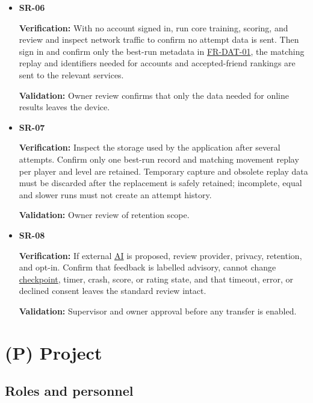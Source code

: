 \documentclass[12pt]{article}
\newcommand{\unumbered}[1]{%
  \phantomsection\section*{#1}\addcontentsline{toc}{section}{#1}}
\newcommand{\booksection}[2]{%
  \clearpage\unumbered{(#1) #2}
  \renewcommand{\thesubsection}{#1.\arabic{subsection}}
  \renewcommand{\theHsubsection}{#1.\arabic{subsection}}
  \setcounter{subsection}{0}}
\begin{document}
\begin{itemize}
 configuration is rejected before flight, \hyperlink{glos:Runtime}{runtime} faults enter a recoverable
 error state, and progress, scores, and stale controls are unaffected.\par
 \textbf{Validation:} Supervisor review of the failure behaviour.
\item \hypertarget{req:SR-06}{}\textbf{SR-06}\par
 \textbf{Verification:} With no account signed in, run core training,
 scoring, and review and inspect network traffic to confirm no attempt data
 is sent. Then sign in and confirm only the best-run metadata in
 \hyperlink{req:FR-DAT-01}{FR-DAT-01}, the matching replay and identifiers needed
 for accounts and accepted-friend rankings are sent to the relevant services.\par
 \textbf{Validation:} Owner review confirms that only the data needed for
 online results leaves the device.
\item \hypertarget{req:SR-07}{}\textbf{SR-07}\par
 \textbf{Verification:} Inspect the storage used by the application after
 several attempts. Confirm only one best-run record and matching movement
 replay per player and level are retained. Temporary capture and obsolete
 replay data must be discarded after the replacement is safely retained;
 incomplete, equal and slower runs must not create an attempt history.\par
 \textbf{Validation:} Owner review of retention scope.
\item \hypertarget{req:SR-08}{}\textbf{SR-08}\par
 \textbf{Verification:} If external \hyperlink{glos:AI}{AI} is proposed, review provider,
 privacy, retention, and opt-in. Confirm that feedback is labelled advisory,
 cannot change \hyperlink{glos:Checkpoint}{checkpoint}, timer, crash, score, or rating state, and that
 timeout, error, or declined consent leaves the standard review intact.\par
 \textbf{Validation:} Supervisor and owner approval before any transfer is enabled.
\end{itemize}

\endgroup

\booksection{P}{Project}



\subsection{Roles and personnel}\label{p1}
\end{document}
